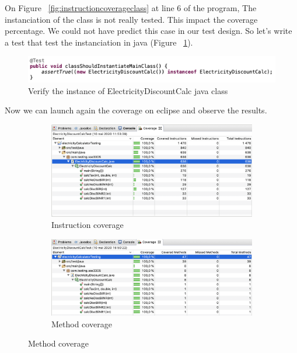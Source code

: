 \documentclass{article}
\begin{document}
    On Figure ~\ref{fig:instructioncoverageclass} at line 6 of the program, The instanciation of the class is not really tested.
    This impact the coverage percentage. We could not have predict this case in our test design. 
    So let's write a test that test the instanciation in java (Figure ~\ref{fig:instanciationtest}).

    \begin{figure}[h!]
		\includegraphics[width=0.8\linewidth, center]{coverage/instanciation_test.png}
		\caption{Verify the instance of ElectricityDiscountCalc java class }
		\label{fig:instanciationtest}
    \end{figure}
    
    Now we can launch again the coverage on eclipse and observe the results.

    \begin{figure}[h!]
		\centering
		\begin{subfigure}[b]{0.5\linewidth}
			\includegraphics[width=\linewidth]{coverage/instruction_coverage_instance.png}
			\caption{Instruction coverage}
		\end{subfigure}
		\begin{subfigure}[b]{0.5\linewidth}
			\includegraphics[width=\linewidth]{coverage/method_coverage_instance.png}
			\caption{Method coverage}
        \end{subfigure}
		\label{fig:coveragereportinstance}
    \end{figure}
    
\end{document}
